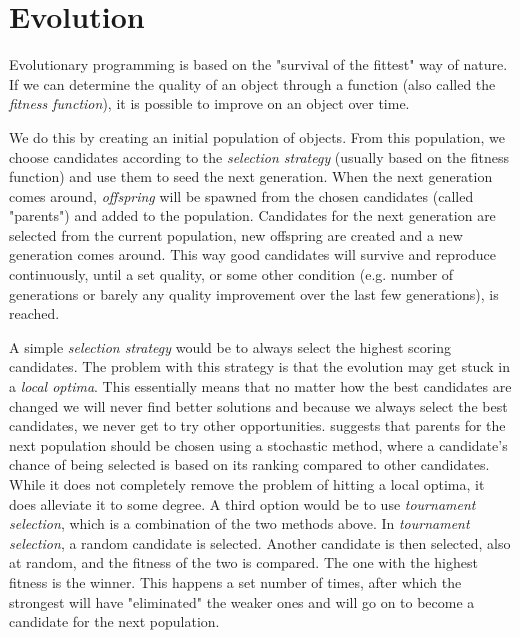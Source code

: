 \section{Evolution}
\label{methodology_evolution}

Evolutionary programming\cite{eiben2008introduction, eiben2002evolutionary} is based on the "survival of the fittest" way of nature. If we can determine the quality of an object through a function (also called the \textit{fitness function}), it is possible to improve on an object over time.

We do this by creating an initial population of objects. From this population, we choose candidates according to the \textit{selection strategy} (usually based on the fitness function) and use them to seed the next generation. When the next generation comes around, \textit{offspring} will be spawned from the chosen candidates (called "parents") and added to the population. Candidates for the next generation are selected from the current population, new offspring are created and a new generation comes around. This way good candidates will survive and reproduce continuously, until a set quality, or some other condition (e.g. number of generations or barely any quality improvement over the last few generations), is reached.

A simple \textit{selection strategy} would be to always select the highest scoring candidates. The problem with this strategy is that the evolution may get stuck in a \textit{local optima}. This essentially means that no matter how the best candidates are changed we will never find better solutions and because we always select the best candidates, we never get to try other opportunities. \citeauthor{rocha1999preventing}\cite{rocha1999preventing} suggests that parents for the next population should be chosen using a stochastic method, where a candidate's chance of being selected is based on its ranking compared to other candidates. While it does not completely remove the problem of hitting a local optima, it does alleviate it to some degree. A third option would be to use \textit{tournament selection}, which is a combination of the two methods above. In \textit{tournament selection}, a random candidate is selected. Another candidate is then selected, also at random, and the fitness of the two is compared. The one with the highest fitness is the winner. This happens a set number of times, after which the strongest will have "eliminated" the weaker ones and will go on to become a candidate for the next population.

